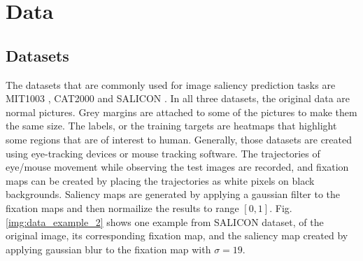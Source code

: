 \documentclass[12pt]{article}
\begin{document}
\section{Data}
\subsection{Datasets}

The datasets that are commonly used for image saliency prediction tasks are MIT1003 \cite{judd2012benchmark}, CAT2000 \cite{borji2015cat2000} and SALICON \cite{jiang2015salicon}.
In all three datasets, the original data are normal pictures. Grey margins are attached to some of the pictures to make them the same size. 
The labels, or the training targets are heatmaps that highlight some regions that are of interest to human.
Generally, those datasets are created using eye-tracking devices or mouse tracking software. The trajectories of eye/mouse movement while
observing the test images are recorded, and fixation maps can be created
by placing the trajectories as white pixels on black backgrounds. Saliency maps are generated by
applying a gaussian filter to the fixation maps and then normailize the results to range $[0, 1]$.
Fig. \ref{img:data_example_2} shows one example from SALICON dataset, of the original image, its corresponding 
fixation map, and the saliency map created by applying gaussian blur to the fixation map with $\sigma=19$.
\end{document}
